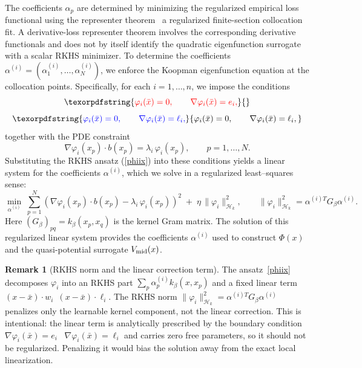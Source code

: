 \documentclass[11pt]{article}
\theoremstyle{plain}      %
\theoremstyle{definition} %
\newtheorem{remark}[theorem]{Remark}
\providecommand{\DIFaddtex}[1]{{\protect\color{blue}#1}} %
\providecommand{\DIFdeltex}[1]{{\protect\color{red}#1}} %
\providecommand{\DIFaddbegin}{} %
\providecommand{\DIFaddend}{} %
\providecommand{\DIFdelbegin}{} %
\providecommand{\DIFdelend}{} %
\providecommand{\DIFadd}[1]{\texorpdfstring{\DIFaddtex{#1}}{#1}} %
\providecommand{\DIFdel}[1]{\texorpdfstring{\DIFdeltex{#1}}{}} %
\newcommand{\DIFscaledelfig}{1.0}
\newlength{\DIFdelgraphicswidth} %
\newlength{\DIFdelgraphicsheight} %
\newcommand{\DIFaddincludegraphics}[2][]{{\color{blue}\fbox{\DIFOincludegraphics[#1]{#2}}}} %
\newcommand{\DIFdelincludegraphics}[2][]{%
\sbox{\DIFdelgraphicsbox}{\DIFOincludegraphics[#1]{#2}}%
\settoboxwidth{\DIFdelgraphicswidth}{\DIFdelgraphicsbox} %
\settoboxtotalheight{\DIFdelgraphicsheight}{\DIFdelgraphicsbox} %
\scalebox{\DIFscaledelfig}{%
\parbox[b]{\DIFdelgraphicswidth}{\usebox{\DIFdelgraphicsbox}\\[-\baselineskip] \rule{\DIFdelgraphicswidth}{0em}}\llap{\resizebox{\DIFdelgraphicswidth}{\DIFdelgraphicsheight}{%
\setlength{\unitlength}{\DIFdelgraphicswidth}%
\begin{picture}(1,1)%
\thicklines\linethickness{2pt} %
{\color[rgb]{1,0,0}\put(0,0){\framebox(1,1){}}}%
{\color[rgb]{1,0,0}\put(0,0){\line( 1,1){1}}}%
{\color[rgb]{1,0,0}\put(0,1){\line(1,-1){1}}}%
\end{picture}%
}\hspace*{3pt}}} %
} %
\DeclareRobustCommand{\DIFaddbegin}{\DIFOaddbegin \let\includegraphics\DIFaddincludegraphics} %
\DeclareRobustCommand{\DIFaddend}{\DIFOaddend \let\includegraphics\DIFOincludegraphics} %
\DeclareRobustCommand{\DIFdelbegin}{\DIFOdelbegin \let\includegraphics\DIFdelincludegraphics} %
\DeclareRobustCommand{\DIFdelend}{\DIFOaddend \let\includegraphics\DIFOincludegraphics} %
\begin{document}
The coefficients $\alpha_p$ are determined by \DIFdelbegin \DIFdel{minimizing the regularized empirical loss functional using the representer theorem }\DIFdelend\ \DIFaddbegin \DIFadd{a regularized finite-section collocation fit. A derivative-loss representer theorem involves the corresponding derivative functionals and does not by itself identify the quadratic eigenfunction surrogate with a scalar RKHS minimizer}\DIFaddend .   
To determine the coefficients $\alpha^{(i)} = (\alpha^{(i)}_1,\dots,\alpha^{(i)}_N)$,
we enforce the Koopman eigenfunction equation at the collocation points.
Specifically, for each $i=1,\dots,n$, we impose the conditions
\DIFdelbegin \[
\DIFdel{\varphi_i(\bar x)=0, \qquad
\nabla\varphi_i(\bar x)=e_i,
}\]%
\DIFdelend \DIFaddbegin \[
\DIFadd{\varphi_i(\bar x)=0, \qquad
\nabla\varphi_i(\bar x)=\ell_i,
}\]\DIFaddend 
together with the PDE constraint
\[
\nabla\varphi_i(x_p)\cdot b(x_p)
= \lambda_i\,\varphi_i(x_p),
\qquad p=1,\dots,N.
\]
Substituting the RKHS ansatz (\ref{phiix}) into these conditions yields a linear
system for the coefficients $\alpha^{(i)}$, which we solve in a
regularized least--squares sense:
\begin{equation}
    \label{eqn:alpha_eqn}
\min_{\alpha^{(i)}} \;
\sum_{p=1}^N 
\left(
\nabla\varphi_i(x_p)\cdot b(x_p)
- \lambda_i\,\varphi_i(x_p)
\right)^2
\;+\;
\eta\,\|\varphi_i\|_{\mathcal{H}_k}^2,
\qquad 
\|\varphi_i\|_{\mathcal H_k}^2
= \alpha^{(i)T} G_\beta \alpha^{(i)}.
\end{equation}
Here $(G_\beta)_{pq}=k_\beta(x_p,x_q)$ is the kernel Gram matrix.
The solution of this regularized linear system provides the coefficients
$\alpha^{(i)}$ used to construct $\Phi(x)$ and the quasi-potential
surrogate $V_{\rm mid}(x)$.


\begin{remark}[RKHS norm and the linear correction term]
The ansatz~\eqref{phiix} decomposes $\varphi_i$ into an RKHS part $\sum_p \alpha_p^{(i)} k_\beta(x,x_p)$ and a fixed linear term \DIFdelbegin \DIFdel{$(x-\bar{x})\cdot w_i$}\DIFdelend\ \DIFaddbegin \DIFadd{$(x-\bar{x})\cdot\ell_i$}\DIFaddend . The RKHS norm $\|\varphi_i\|_{\mathcal{H}_k}^2 = \alpha^{(i)T}G_\beta\alpha^{(i)}$ penalizes only the learnable kernel component, not the linear correction. This is intentional: the linear term is analytically prescribed by the boundary condition \DIFdelbegin \DIFdel{$\nabla\varphi_i(\bar{x})=e_i$ }\DIFdelend\ \DIFaddbegin \DIFadd{$\nabla\varphi_i(\bar{x})=\ell_i$ }\DIFaddend and carries zero free parameters, so it should not be regularized. Penalizing it would bias the solution away from the exact local linearization.
\end{remark}
\end{document}
